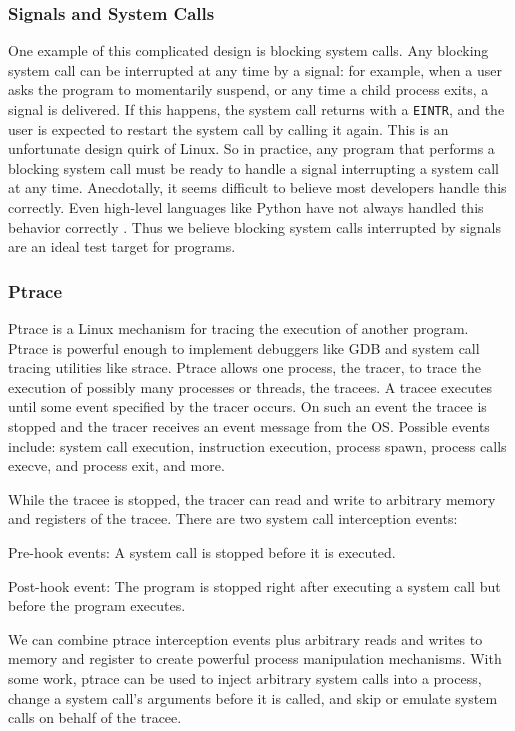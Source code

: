 \subsubsection{Signals and System Calls}
\label{blockingandsignals}
One example of this complicated design is blocking system calls. Any blocking system call can be interrupted at any time by a signal: for example, when a user asks the program to momentarily suspend, or any time a child process exits, a signal is delivered. If this happens, the system call returns with a \texttt{EINTR}, and the user is expected to restart the system call by calling it again. This is an unfortunate design quirk of Linux. So in practice, any program that performs a blocking system call must be ready to handle a signal interrupting a system call at any time. Anecdotally, it seems difficult to believe most developers handle this correctly. Even high-level languages like Python have not always handled this behavior correctly \cite{pep}. Thus we believe blocking system calls interrupted by signals are an ideal test target for programs.

\subsubsection{Ptrace} \label{sec:ptrace-summary}
Ptrace is a Linux mechanism for tracing the execution of another program. Ptrace     is powerful enough to implement debuggers like GDB and system call tracing utilities     like strace. Ptrace allows one process, the tracer, to trace the execution of possibly     many processes or threads, the tracees. A tracee executes until some event specified by the tracer occurs. On such an event the tracee is stopped and the tracer receives an event message from the OS. Possible events include: system call execution, instruction execution, process spawn, process calls execve, and process exit, and more.

While the tracee is stopped, the tracer can read and write to arbitrary memory and registers of the tracee. There are two system call interception events:
\begin{compactitem}

     \item Pre-hook events: A system call is stopped before it is executed.
     \item Post-hook event: The program is stopped right after executing a system call but before the program executes.
\end{compactitem}
     We can combine ptrace interception events plus arbitrary reads and writes to memory and register to create powerful process manipulation mechanisms. With some work, ptrace can be used to inject arbitrary system calls into a process, change a system call's arguments before it is called, and skip or emulate system calls on behalf of the tracee.
